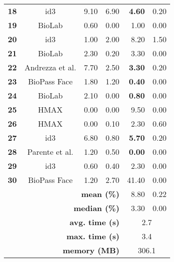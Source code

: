 \begin{table}[!tb]
\begin{tabular}{ccrrrr}
\textbf{18} & id3 & 9.10 & {\color[HTML]{9B9B9B} 6.90} & \textbf{4.60} & {\color[HTML]{9B9B9B} 0.20} \\
\textbf{19} & BioLab & 0.60 & {\color[HTML]{9B9B9B} 0.00} & 1.00 & {\color[HTML]{9B9B9B} 0.00} \\
\textbf{20} & id3 & 1.00 & {\color[HTML]{9B9B9B} 2.00} & 8.20 & {\color[HTML]{9B9B9B} 1.50} \\
\textbf{21} & BioLab & 2.30 & {\color[HTML]{9B9B9B} 0.20} & 3.30 & {\color[HTML]{9B9B9B} 0.00} \\
\textbf{22} & Andrezza et al. & 7.70 & {\color[HTML]{9B9B9B} 2.50} & \textbf{3.30} & {\color[HTML]{9B9B9B} 0.20} \\
\textbf{23} & BioPass Face & 1.80 & {\color[HTML]{9B9B9B} 1.20} & \textbf{0.40} & {\color[HTML]{9B9B9B} 0.00} \\
\textbf{24} & BioLab & 2.10 & {\color[HTML]{9B9B9B} 0.00} & \textbf{0.80} & {\color[HTML]{9B9B9B} 0.00} \\
\textbf{25} & HMAX & 0.00 & {\color[HTML]{9B9B9B} 0.00} & 9.50 & {\color[HTML]{9B9B9B} 0.00} \\
\textbf{26} & HMAX & 0.00 & {\color[HTML]{9B9B9B} 0.10} & 2.30 & {\color[HTML]{9B9B9B} 0.60} \\
\textbf{27} & id3 & 6.80 & {\color[HTML]{9B9B9B} 0.80} & \textbf{5.70} & {\color[HTML]{9B9B9B} 0.20} \\
\textbf{28} & Parente et al. & 1.20 & {\color[HTML]{9B9B9B} 0.50} & \textbf{0.00} & {\color[HTML]{9B9B9B} 0.00} \\
\textbf{29} & id3 & 0.60 & {\color[HTML]{9B9B9B} 0.40} & 2.30 & {\color[HTML]{9B9B9B} 0.00} \\
\textbf{30} & BioPass Face & 1.20 & {\color[HTML]{9B9B9B} 2.70} & 41.40 & {\color[HTML]{9B9B9B} 0.00} \\ \hline
\multicolumn{4}{r}{\textbf{mean (\%)}} & 8.80 & 0.22 \\
\multicolumn{4}{r}{\textbf{median (\%)}} & 3.30 & 0.00 \\
\multicolumn{4}{r}{\textbf{avg. time (s)}} & \multicolumn{2}{c}{2.7} \\
\multicolumn{4}{r}{\textbf{max. time (s)}} & \multicolumn{2}{c}{3.4} \\
\multicolumn{4}{r}{\textbf{memory (MB)}} & \multicolumn{2}{c}{306.1}
\end{tabular}
\end{table}